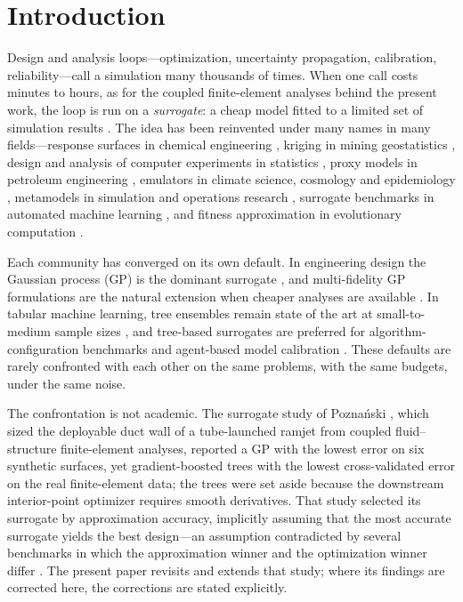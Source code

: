 \section{Introduction}
\label{sec:intro}

Design and analysis loops---optimization, uncertainty propagation, calibration, reliability---call a simulation many
thousands of times. When one call costs minutes to hours, as for the coupled finite-element analyses behind the present
work, the loop is run on a \emph{surrogate}: a cheap model fitted to a limited set of simulation results
\cite{queipo2005surrogate,forrester2008engineering,forrester2009recent}. The idea has been reinvented under many names
in many fields---response surfaces in chemical engineering \cite{box1951experimental}, kriging in mining geostatistics
\cite{krige1951statistical,matheron1963principles,cressie1990origins}, design and analysis of computer experiments in
statistics \cite{sacks1989design,santner2003design}, proxy models in petroleum engineering \cite{bahrami2022proxy},
emulators in climate science, cosmology and epidemiology
\cite{watsonparris2022climatebench,heitmann2009coyote,andrianakis2015bayesian}, metamodels in simulation and operations
research \cite{kleijnen2015design}, surrogate benchmarks in automated machine learning
\cite{eggensperger2015efficient}, and fitness approximation in evolutionary computation \cite{jin2005comprehensive,jin2011surrogate}.

Each community has converged on its own default. In engineering design the Gaussian process (GP) is the dominant
surrogate \cite{forrester2008engineering,gramacy2020surrogates}, and multi-fidelity GP formulations are the natural
extension when cheaper analyses are available \cite{kennedy2000predicting,forrester2007multi,needels2024efficient}. In
tabular machine learning, tree ensembles remain state of the art at small-to-medium sample sizes
\cite{grinsztajn2022tree,shwartzziv2022tabular,mcelfresh2023neural}, and tree-based surrogates are preferred for
algorithm-configuration benchmarks \cite{eggensperger2015efficient,eggensperger2018efficient} and agent-based model
calibration \cite{lamperti2018agent}. These defaults are rarely confronted with each other on the same problems, with
the same budgets, under the same noise.

The confrontation is not academic. The surrogate study of Pozna\'nski \cite[Sec.~14.3 and App.~G]{poznanski2026towards},
which sized the deployable duct wall of a tube-launched ramjet from coupled fluid--structure finite-element analyses,
reported a GP with the lowest error on six synthetic surfaces, yet gradient-boosted trees with the lowest
cross-validated error on the real finite-element data; the trees were set aside because the downstream interior-point
optimizer requires smooth derivatives. That study selected its surrogate by approximation accuracy, implicitly assuming
that the most accurate surrogate yields the best design---an assumption contradicted by several benchmarks in which the
approximation winner and the optimization winner differ
\cite{williams2021selection,eggensperger2015efficient,neufang2024surrogate}. The present paper revisits and extends that
study; where its findings are corrected here, the corrections are stated explicitly.

